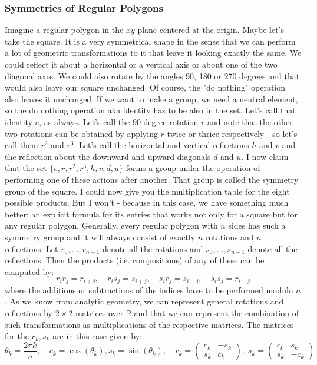 \subsubsection{Symmetries of Regular Polygons}
Imagine a regular polygon in the $xy$-plane centered at the origin. Maybe let's take the square. It is a very symmetrical shape in the sense that we can perform a lot of geometric transformations to it that leave it looking exactly the same. We could reflect it about a horizontal or a vertical axis or about one of the two diagonal axes. We could also rotate by the angles 90, 180 or 270 degrees and that would also leave our square unchanged. Of course, the "do nothing" operation also leaves it unchanged. If we want to make a group, we need a neutral element, so the do nothing operation aka identity has to be also in the set. Let's call that identity $e$, as always. Let's call the 90 degree rotation $r$ and note that the other two rotations can be obtained by applying $r$ twice or thrice respectively - so let's call them $r^2$ and $r^3$. Let's call the horizontal and vertical reflections $h$ and $v$ and the reflection about the downward and upward diagonals $d$ and $u$. I now claim that the set $\{ e,r,r^2,r^3,h,v,d,u \}$ forms a group under the operation of performing one of these actions after another. That group is called the symmetry group of the square. I could now give you the multiplication table for the eight possible products. But I won't - because in this case, we have something much better: an explicit formula for its entries that works not only for a square but for any regular polygon. Generally, every regular polygon with $n$ sides has such a symmetry group and it will always consist of exactly $n$ rotations and $n$ reflections. Let $r_0,\ldots,r_{n-1}$ denote all the rotations and $s_0, \ldots,s_{n-1}$ denote all the reflections. Then the products (i.e. compositions) of any of these can be computed by:
\begin{equation}
r_i r_j = r_{i+j}, \quad
r_i s_j = s_{i+j}, \quad
s_i r_j = s_{i-j}, \quad
s_i s_j = r_{i-j}
\end{equation}	
where the additions or subtractions of the indices have to be performed modulo $n$. As we know from analytic geometry, we can represent general rotations and reflections by $2 \times 2$ matrices over $\mathbb{R}$ and that we can represent the combination of such transformations as multiplications of the respective matrices. The matrices for the $r_k, s_k$ are in this case given by:
\begin{equation}
\label{Eq:PolygonSymmetries}
\theta_k =\frac{2 \pi k}{n},  \quad
c_k = \cos(\theta_k), s_k = \sin(\theta_k), \quad	
r_k = \begin{pmatrix}  c_k & -s_k \\  s_k  &  c_k  \end{pmatrix}, \;
s_k = \begin{pmatrix}  c_k &  s_k \\  s_k  & -c_k  \end{pmatrix} \quad
\end{equation}	
